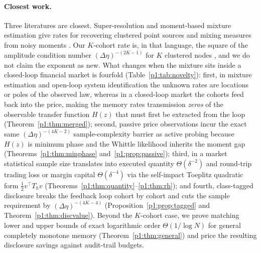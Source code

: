 \paragraph{Closest work.} Three literatures are closest. Super-resolution and moment-based mixture estimation give rates for recovering clustered point sources and mixing measures from noisy moments \citep{p1:heinrich2018,p1:batenkov2021,p1:liu2023,p1:wu2020,p1:kong2017}. Our $K$-cohort rate is, in that language, the square of the amplitude condition number $(\Delta\eta)^{-(2K-1)}$ for $K$ clustered nodes \citep{p1:heinrich2018,p1:wu2020}, and we do not claim the exponent as new. What changes when the mixture sits inside a closed-loop financial market is fourfold (Table~\ref{p1:tab:novelty}): first, in mixture estimation and open-loop system identification the unknown rates are locations or poles of the observed law, whereas in a closed-loop market the cohorts feed back into the price, making the memory rates transmission \emph{zeros} of the observable transfer function $H(z)$ that must first be extracted from the loop (Theorem~\ref{p1:thm:merged}); second, passive price observations incur the exact same $(\Delta\eta)^{-(4K-2)}$ sample-complexity barrier as active probing because $H(z)$ is minimum phase and the Whittle likelihood inherits the moment gap (Theorems~\ref{p1:thm:minphase} and~\ref{p1:prop:passive}); third, in a market statistical sample size translates into executed quantity $\Theta(\delta^{-2})$ and round-trip trading loss or margin capital $\Theta(\delta^{-4})$ via the self-impact Toeplitz quadratic form $\tfrac12 v^\top T_h v$ (Theorems~\ref{p1:thm:quantity}--\ref{p1:thm:rh}); and fourth, class-tagged disclosure breaks the feedback loop cohort by cohort and cuts the sample requirement by $(\Delta\eta)^{-(4K-4)}$ (Proposition~\ref{p1:prop:tagged} and Theorem~\ref{p1:thm:discvalue}). Beyond the $K$-cohort case, we prove matching lower and upper bounds of exact logarithmic order $\Theta(1/\log N)$ for general completely monotone memory (Theorem~\ref{p1:thm:general}) and price the resulting disclosure savings against audit-trail budgets.

